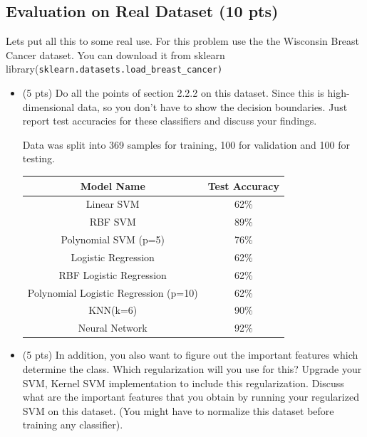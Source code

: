 \documentclass[a4paper]{article}
\theoremstyle{definition}
\newenvironment{soln}{
    \leavevmode\color{blue}\ignorespaces
}{}
\begin{document}
 \subsection{Evaluation on Real Dataset (10 pts)}
 Lets put all this to some real use. For this problem use the the Wisconsin Breast Cancer dataset. You can download it from sklearn library(\texttt{sklearn.datasets.load\_breast\_cancer)
}
\begin{itemize}
    \item (5 pts) Do all the points of section 2.2.2 on this dataset. Since this is high-dimensional data, so you don't have to show the decision boundaries. Just report test accuracies for these classifiers and discuss your findings.
    
    \begin{soln}
        Data was split into 369 samples for training, 100 for validation and 100 for testing.
        \begin{center}
            \begin{tabular}{|c|c|}
                \hline
                Model Name & Test Accuracy \\
                \hline
                Linear SVM & 62\% \\
                RBF SVM & 89\% \\
                Polynomial SVM (p=5) & 76\% \\
                Logistic Regression & 62\% \\
                RBF Logistic Regression & 62\% \\
                Polynomial Logistic Regression (p=10) & 62\% \\
                KNN(k=6) & 90\% \\
                Neural Network & 92\% \\
                \hline
            \end{tabular}
        \end{center}
    \end{soln}
    
    \item (5 pts) In addition, you also want to figure out the  important features which determine the class. Which regularization will you use for this? Upgrade your SVM, Kernel SVM implementation to include this regularization. Discuss what are the important features that you obtain by running your regularized SVM on this dataset. (You might have to normalize this dataset before training any classifier).
    

\end{itemize}
\end{document}
